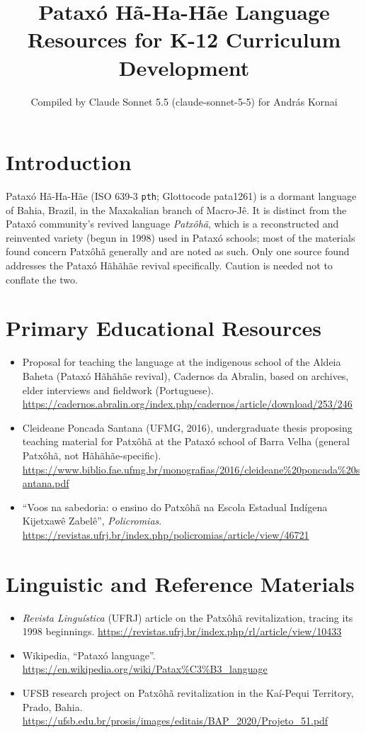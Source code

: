 \documentclass[12pt]{article}
\title{Pataxó Hã-Ha-Hãe Language Resources for K-12 Curriculum Development}
\author{Compiled by Claude Sonnet 5.5 (claude-sonnet-5-5) for Andr\'as Kornai}
\date{}
\begin{document}
\maketitle

\section{Introduction}
Pataxó Hã-Ha-Hãe (ISO 639-3 \texttt{pth}; Glottocode pata1261) is a dormant language of Bahia, Brazil, in the Maxakalian branch of Macro-Jê. It is distinct from the Pataxó community's revived language \emph{Patxôhã}, which is a reconstructed and reinvented variety (begun in 1998) used in Pataxó schools; most of the materials found concern Patxôhã generally and are noted as such. Only one source found addresses the Pataxó Hãhãhãe revival specifically. Caution is needed not to conflate the two.

\section{Primary Educational Resources}
\begin{itemize}
\item Proposal for teaching the language at the indigenous school of the Aldeia Baheta (Pataxó Hãhãhãe revival), Cadernos da Abralin, based on archives, elder interviews and fieldwork (Portuguese). \url{https://cadernos.abralin.org/index.php/cadernos/article/download/253/246}
\item Cleideane Poncada Santana (UFMG, 2016), undergraduate thesis proposing teaching material for Patxôhã at the Pataxó school of Barra Velha (general Patxôhã, not Hãhãhãe-specific). \url{https://www.biblio.fae.ufmg.br/monografias/2016/cleideane%20poncada%20santana.pdf}
\item ``Voos na sabedoria: o ensino do Patxôhã na Escola Estadual Ind\'igena Kijetxawê Zabel\^e'', \emph{Policromias}. \url{https://revistas.ufrj.br/index.php/policromias/article/view/46721}
\end{itemize}

\section{Linguistic and Reference Materials}
\begin{itemize}
\item \emph{Revista Linguística} (UFRJ) article on the Patxôhã revitalization, tracing its 1998 beginnings. \url{https://revistas.ufrj.br/index.php/rl/article/view/10433}
\item Wikipedia, ``Pataxó language''. \url{https://en.wikipedia.org/wiki/Patax%C3%B3_language}
\item UFSB research project on Patxôhã revitalization in the Kaí-Pequi Territory, Prado, Bahia. \url{https://ufsb.edu.br/prosis/images/editais/BAP_2020/Projeto_51.pdf}
\end{itemize}
\end{document}
